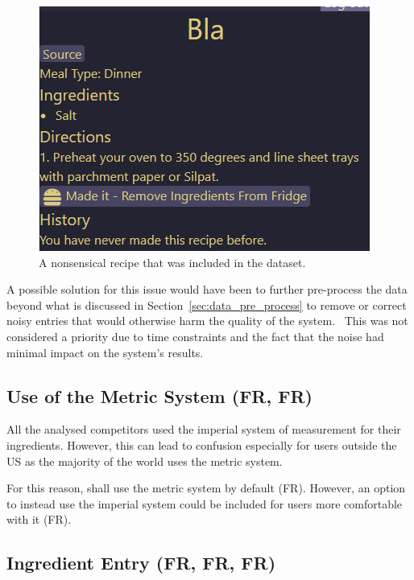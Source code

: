 \begin{figure}[h]
    \centering
    \caption{\label{fig:bad_recipe_entry}A nonsensical recipe that was included in the dataset.}
    \includegraphics[scale=0.75]{figures/bad_recipe_entry.png}
\end{figure}

A possible solution for this issue would have been to further pre-process the data beyond what is
discussed in Section~\ref{sec:data_pre_process} to remove or correct noisy entries that would otherwise
harm the quality of the system.~\cite{garcia_big_2016} This was not considered a priority due to time
constraints and the fact that the noise had minimal impact on the system's results.

\subsection{Use of the Metric System (FR, FR)}

All the analysed competitors used the imperial system of measurement for their ingredients. However, this
can lead to confusion especially for users outside the US as the majority of the world uses the metric system.~\cite{pomroy_metric_2008}

For this reason, \chef{} shall use the metric system by default (FR). However, an option to
instead use the imperial system could be included for users more comfortable with it (FR).

\subsection{Ingredient Entry (FR, FR, FR)}

